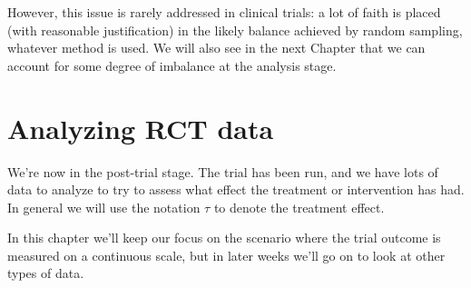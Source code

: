 \documentclass[
  openany]{book}
\theoremstyle{definition}
\theoremstyle{definition}
\theoremstyle{definition}
\theoremstyle{definition}
\theoremstyle{remark}
\begin{document}
However, this issue is rarely addressed in clinical trials: a lot of faith is placed (with reasonable justification) in the likely balance achieved by random sampling, whatever method is used. We will also see in the next Chapter that we can account for some degree of imbalance at the analysis stage.

\hypertarget{rct-analysis}{%
\chapter{Analyzing RCT data}\label{rct-analysis}}

We're now in the post-trial stage. The trial has been run, and we have lots of data to analyze to try to assess what effect the treatment or intervention has had. In general we will use the notation \(\tau\) to denote the treatment effect.

In this chapter we'll keep our focus on the scenario where the trial outcome is measured on a continuous scale, but in later weeks we'll go on to look at other types of data.
\end{document}
